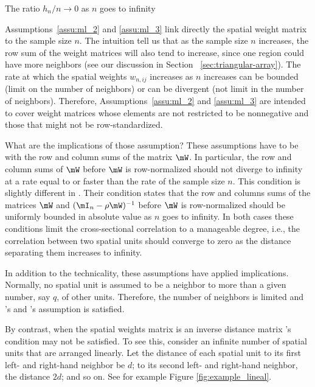 \documentclass[english,12pt]{book}\usepackage[]{graphicx}\usepackage[]{xcolor}
\begin{document}
\begin{assumption}\label{assu:ml_3}
	The ratio $h_n/n \to 0$ as $n$ goes to infinity
\end{assumption}

Assumptions~\ref{assu:ml_2} and \ref{assu:ml_3} link directly the spatial weight matrix to the sample size $n$. The intuition tell us that as the sample size $n$ increases, the row sum of the weight matrices will also tend to increase, since one region could have more neighbors (see our discussion in Section ~\ref{sec:triangular-array}). The rate at which the spatial weights $w_{n,ij}$ increases as $n$ increases can be bounded (limit on the number of neighbors) or can be divergent (not limit in the number of neighbors). Therefore, Assumptions~\ref{assu:ml_2} and \ref{assu:ml_3} are intended to cover weight matrices whose elements are not restricted to be nonnegative and those that might not be row-standardized. 

What are the implications of those assumption? These assumptions have to be with the row and column sums of the matrix $\mW$. In particular, the row and column sums of $\mW$ before $\mW$ is row-normalized should not diverge to infinity at a rate equal to or faster than the rate of the sample size $n$. This condition is slightly different in \cite{kelejian1998generalized, kelejian1999generalized}. Their condition states that the row and columns sums of the matrices $\mW$ and $(\mI_n - \rho\mW)^{-1}$ before $\mW$ is row-normalized should be uniformly bounded in absolute value as $n$ goes to infinity. In both cases these conditions limit the cross-sectional correlation to a manageable degree, i.e., the correlation between two spatial units should converge to zero as the distance separating them increases to infinity. 

In addition to the technicality, these assumptions have applied implications. Normally, no spatial unit is assumed to be a neighbor to more than a given number, say $q$, of other units. Therefore, the number of neighbors is limited and \cite{lee2004asymptotic}'s and  \cite{kelejian1998generalized, kelejian1999generalized}'s assumption is satisfied. 

By contrast, when the spatial weights matrix is an inverse distance matrix \cite{kelejian1998generalized, kelejian1999generalized}'s condition may not be satisfied. To see this, consider an infinite number of spatial units that are arranged linearly. Let the distance of each spatial unit to its first left- and right-hand neighbor be $d$; to its second left- and right-hand neighbor, the distance $2d$; and so on. See for example Figure \ref{fig:example_lineal}.
\end{document}
